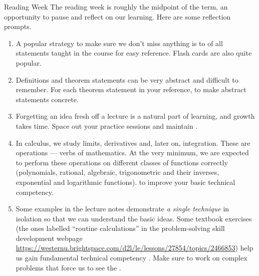 \documentclass[../main.tex]{subfiles}
\begin{document}
\begin{lesson}{Reading Week}
  The reading week is roughly the midpoint of the term, an opportunity to pause and reflect on our learning. Here are some reflection prompts.

  \begin{enumerate}
    \item {} A popular strategy to make sure we don't miss anything is to  of all statements taught in the course for easy reference. Flash cards are also quite popular.

    \item {} Definitions and theorem statements can be very abstract and difficult to remember. For each theorem statement in your reference,  to make abstract statements concrete.

    \item {} Forgetting an idea fresh off a lecture is a natural part of learning, and growth takes time. Space out your practice sessions and maintain .

    \item {} In calculus, we study limits, derivatives and, later on, integration. These are operations --- verbs of mathematics. At the very minimum, we are expected to perform these operations on different classes of functions correctly (polynomials, rational, algebraic, trigonometric and their inverses, exponential and logarithmic functions).  to improve your basic technical competency.

    \item {} Some examples in the lecture notes demonstrate \emph{a single technique} in isolation so that we can understand the basic ideas. Some textbook exercises (the ones labelled ``routine calculations'' in the problem-solving skill development webpage \url{https://westernu.brightspace.com/d2l/le/lessons/27854/topics/2466853}) help us gain fundamental technical competency . Make sure to work on complex problems that force us to see the .


\end{enumerate}
\end{lesson}
\end{document}
